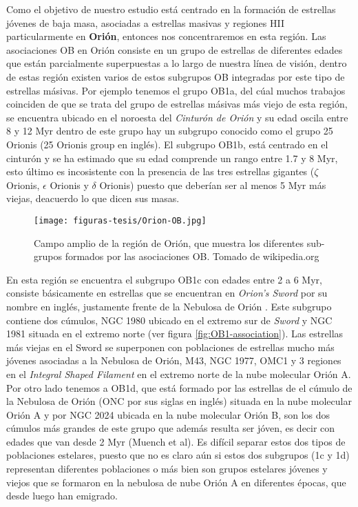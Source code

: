 \documentclass{article}
\begin{document}
 Como el objetivo de nuestro estudio está centrado en la formación de estrellas jóvenes de baja masa, asociadas a estrellas masivas y regiones HII particularmente en \textbf{Orión}, entonces nos concentraremos en esta región. Las asociaciones OB en Orión consiste en un grupo de estrellas de diferentes edades que están parcialmente superpuestas a lo largo de nuestra línea de visión, dentro de estas región existen varios de estos subgrupos OB integradas por este tipo de estrellas másivas. Por ejemplo tenemos el grupo OB1a, del cúal muchos trabajos coinciden de que se trata del grupo de estrellas másivas más viejo de esta región, se encuentra ubicado en el noroesta del \textit{Cinturón de Orión} y su edad oscila entre 8 y 12 Myr \citep{Blaauw:1991, Brown:1994} dentro de este grupo hay un subgrupo conocido como el grupo 25 Orionis (25 Orionis group en inglés). El subgrupo OB1b, está centrado en el cinturón y se ha estimado que su edad comprende un rango entre 1.7 y 8 Myr, esto último es incosistente con la presencia de las tres estrellas gigantes (\(\zeta\) Orionis, \(\epsilon\) Orionis y \(\delta\) Orionis) puesto que deberían ser al menos 5 Myr más viejas, deacuerdo lo que dicen sus masas.\\

\begin{figure}
  \centering
  \texttt{[image: figuras-tesis/Orion-OB.jpg]}
  \caption{Campo amplio de la región de Orión, que muestra los diferentes sub-grupos formados por las asociaciones OB. Tomado de wikipedia.org  }
  \label{fig:orionOB}
\end{figure}
  
En esta región se encuentra el subgrupo OB1c con edades entre 2 a 6 Myr, consiste básicamente  en estrellas que se encuentran en \textit{Orion's Sword} por su nombre en inglés, justamente frente de la Nebulosa de Orión . Este subgrupo contiene dos cúmulos, NGC 1980 ubicado en el extremo sur de \textit{Sword} y NGC 1981 situada en el extremo norte (ver figura \ref{fig:OB1-association}). Las estrellas más viejas en el Sword se superponen con poblaciones de estrellas mucho más jóvenes asociadas a la Nebulosa de Orión, M43, NGC 1977, OMC1 y 3 regiones en el \textit{Integral Shaped Filament} en el extremo norte de la nube molecular Orión A. Por otro lado tenemos a OB1d, que está formado por las estrellas de el cúmulo de la Nebulosa de Orión (ONC por sus siglas en inglés) situada en la nube molecular Orión A y por NGC 2024 ubicada en la nube molecular Orión B, son los dos cúmulos más grandes de este grupo que además resulta ser jóven, es decir con edades que van desde 2 Myr (Muench et al). Es difícil separar estos dos tipos de poblaciones estelares, puesto que no es claro aún si estos dos subgrupos (1c y 1d) representan diferentes poblaciones o más bien son grupos estelares jóvenes y viejos que se formaron en la nebulosa de nube Orión A en diferentes épocas, que desde luego han emigrado.
\end{document}
